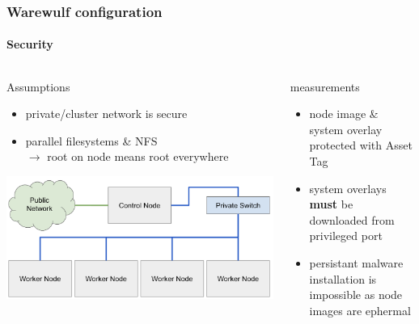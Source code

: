 \documentclass[aspectratio=169]{beamer}
\begin{document}
\begin{frame}[fragile]
\frametitle{Warewulf configuration}
\framesubtitle{Security}
\begin{columns}
\begin{block}{Assumptions}
  \begin{itemize}
    \item private/cluster network is secure
    \item parallel filesystems \& NFS \\
    $\rightarrow$ root on node means root everywhere
  \end{itemize}
  \includegraphics[width=\linewidth]{beowulf_architecture}
\end{block}
\begin{block}{measurements}
  \begin{itemize}
    \item node image \& system overlay protected with Asset Tag 
    \item system overlays \textbf{must} be downloaded from privileged port
    \item persistant malware installation is impossible as node images are ephermal
  \end{itemize}
\end{block}
\end{columns}
\end{frame}
\end{document}
